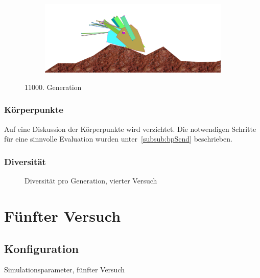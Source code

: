 \begin{figure}[H]
\begin{subfigure}[b]{0.45\textwidth}
            \includegraphics[width=\linewidth,center]{graphics/simulation-results/4_gen11000_4}
            \caption{\label{fig:gen11000_4}}
          \end{subfigure}
          \caption{11000. Generation\label{fig:gen11000}}
        \end{figure}

      \subsubsection{Körperpunkte}

        Auf eine Diskussion der Körperpunkte wird verzichtet.
        Die notwendigen Schritte für eine sinnvolle Evaluation wurden unter~\vref{subsub:bpScnd} beschrieben.

      \subsubsection{Diversität}

        \begin{figure}[H]
          \centering
          
          \caption{Diversität pro Generation, vierter Versuch\label{fig:graphDivFourth}}
        \end{figure}

  \section{Fünfter Versuch}

    \subsection{Konfiguration}

      \begin{table}[H]
        \centering
        
        \caption{Simulationsparameter, fünfter Versuch}
      \end{table}

